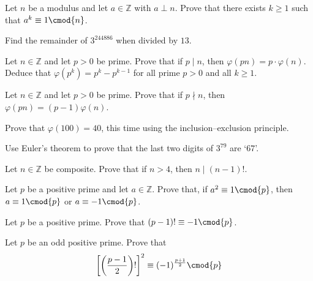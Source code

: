 \begin{exercise}
\label{exPowerModN}
Let $n$ be a modulus and let $a \in \mathbb{Z}$ with $a \perp n$. Prove that there exists $k \ge 1$ such that $a^k \equiv 1 \cmod{n}$.
\end{exercise}


\begin{exercise}
\label{RemainderOfThreeExpBigRemThirteen}
Find the remainder of $3^{244886}$ when divided by $13$.
\end{exercise}


\begin{exercise}
\label{exTotientMultiplyByPrime}
Let $n \in \mathbb{Z}$ and let $p > 0$ be prime. Prove that if $p \mid n$, then $\varphi(pn) = p \cdot \varphi(n)$. Deduce that $\varphi(p^k) = p^k-p^{k-1}$ for all prime $p>0$ and all $k \ge 1$.
\end{exercise}


\begin{exercise}
Let $n \in \mathbb{Z}$ and let $p>0$ be prime. Prove that if $p \nmid n$, then $\varphi(pn)=(p-1)\varphi(n)$.
\end{exercise}


\begin{exercise}
Prove that $\varphi(100)=40$, this time using the inclusion--exclusion principle.
\end{exercise}


\begin{exercise}
Use Euler's theorem to prove that the last two digits of $3^{79}$ are `$67$'.
\end{exercise}

\begin{exercise} \label{exCompositeDividesFactorial}
Let $n \in \mathbb{Z}$ be composite. Prove that if $n>4$, then $n \mid (n-1)!$.
\end{exercise}

\begin{exercise} \label{exSquareCongruentToOneModPrimeUnit}
Let $p$ be a positive prime and let $a \in \mathbb{Z}$. Prove that, if $a^2 \equiv 1 \cmod{p}$, then $a \equiv 1 \cmod{p}$ or $a \equiv {-1} \cmod{p}$. 
\end{exercise}


\begin{exercise}
\label{exPrimeFactorialCongruentToMinusOne}
Let $p$ be a positive prime. Prove that $(p-1)! \equiv -1 \cmod{p}$.
\end{exercise}


\begin{exercise}
Let $p$ be an odd positive prime. Prove that
\[ \left[ \left( \frac{p-1}{2} \right)! \right]^2 \equiv (-1)^{\frac{p+1}{2}} \cmod{p} \]
\end{exercise}

